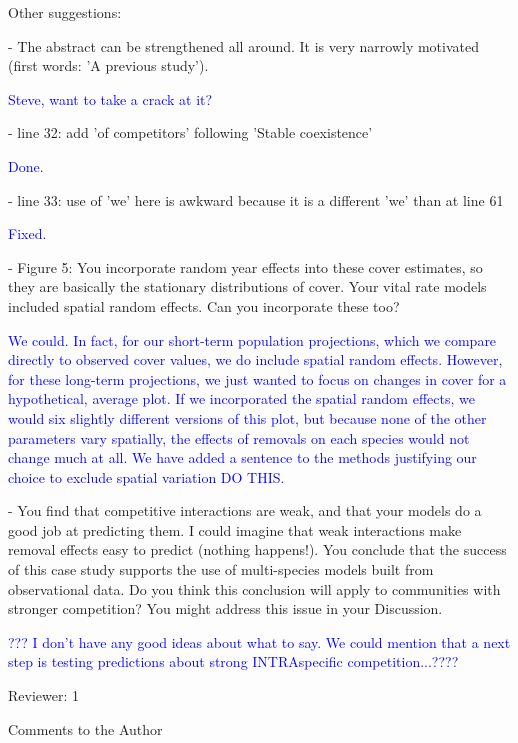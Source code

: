 \documentclass[12pt]{article}
\newcommand{\response}{\textcolor{blue}}
\begin{document}
Other suggestions:

- The abstract can be strengthened all around. It is very narrowly motivated (first words: 'A previous study').

\response{Steve, want to take a crack at it?}

- line 32: add 'of competitors' following 'Stable coexistence'

\response{Done.}

- line 33: use of 'we' here is awkward because it is a different 'we' than at line 61

\response{Fixed.}

- Figure 5: You incorporate random year effects into these cover estimates, so they are basically the stationary distributions of cover. Your vital rate models included spatial random effects. Can you incorporate these too?

\response{We could. In fact, for our short-term population projections, which we compare directly to observed cover values, we do include spatial random effects. However, for these long-term projections, we just wanted to focus on changes in cover for a hypothetical, average plot. If we incorporated the spatial random effects, we would six slightly different versions of this plot, but because none of the other parameters vary spatially, the effects of removals on each species would not change much at all. We have added a sentence to the methods justifying our choice to exclude spatial variation DO THIS. }

- You find that competitive interactions are weak, and that your models do a good job at predicting them. I could imagine that weak interactions make removal effects easy to predict (nothing happens!). You conclude that the success of this case study supports the use of multi-species models built from observational data. Do you think this conclusion will apply to communities with stronger competition? You might address this issue in your Discussion.

\response{ ??? I don't have any good ideas about what to say. We could mention that a next step is testing predictions about strong INTRAspecific competition...????  }

Reviewer: 1

Comments to the Author
\end{document}
